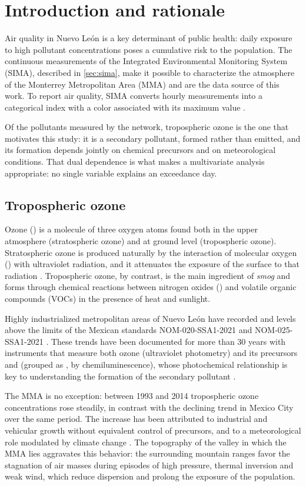 \section{Introduction and rationale}
\label{sec:introduccion}

Air quality in Nuevo León is a key determinant of public health: daily
exposure to high pollutant concentrations poses a cumulative risk to the
population. The continuous measurements of the Integrated Environmental
Monitoring System (SIMA), described in \cref{sec:sima}, make it possible to
characterize the atmosphere of the Monterrey Metropolitan Area (MMA) and are
the data source of this work. To report air quality, SIMA converts hourly
measurements into a categorical index with a color associated with its
maximum value \parencite{aireNL2026}.

Of the pollutants measured by the network, tropospheric ozone is the one
that motivates this study: it is a secondary pollutant, formed rather than
emitted, and its formation depends jointly on chemical precursors and on
meteorological conditions. That dual dependence is what makes a
multivariate analysis appropriate: no single variable explains an
exceedance day.

\subsection{Tropospheric ozone}
\label{sec:objetivo}

Ozone () is a molecule of three oxygen atoms found both in the upper
atmosphere (stratospheric ozone) and at ground level (tropospheric ozone).
Stratospheric ozone is produced naturally by the interaction of molecular
oxygen () with ultraviolet radiation, and it attenuates the exposure
of the surface to that radiation \parencite{Bernhard2023-lk}. Tropospheric
ozone, by contrast, is the main ingredient of \textit{smog} and forms through
chemical reactions between nitrogen oxides () and volatile organic
compounds (VOCs) in the presence of heat and sunlight.

Highly industrialized metropolitan areas of Nuevo León have recorded
 and  levels above the limits of the Mexican standards
NOM-020-SSA1-2021 \parencite{nom020ssa1} and NOM-025-SSA1-2021
\parencite{nom025ssa1}. These trends have been documented for more than
30 years with instruments that measure both ozone (ultraviolet photometry)
and its precursors  and  (grouped as , by
chemiluminescence), whose photochemical relationship is key to understanding
the formation of the secondary pollutant \parencite{SanfordSillman}.

The MMA is no exception: between 1993 and 2014 tropospheric ozone
concentrations rose steadily, in contrast with the declining trend in Mexico
City over the same period. The increase has been attributed to industrial and
vehicular growth without equivalent control of precursors, and to a
meteorological role modulated by climate change \parencite{atmos15070779}.
The topography of the valley in which the MMA lies aggravates this behavior:
the surrounding mountain ranges favor the stagnation of air masses during
episodes of high pressure, thermal inversion and weak wind, which reduce
dispersion and prolong the exposure of the population.
